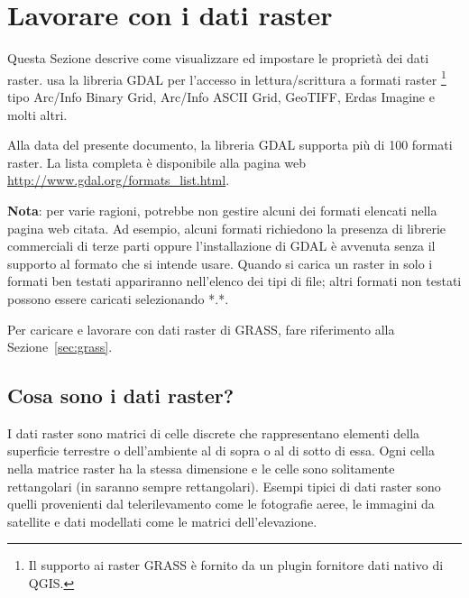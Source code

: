 
\chapter{Lavorare con i dati raster}\label{label_raster}


Questa Sezione descrive come visualizzare ed impostare le proprietà dei dati
raster. 
\qg usa la libreria GDAL per l'accesso in lettura/scrittura a formati raster
\footnote{Il supporto ai raster GRASS è fornito da un plugin fornitore dati nativo di QGIS.}
tipo Arc/Info Binary Grid,
Arc/Info ASCII Grid, GeoTIFF,
Erdas Imagine e molti altri. 

Alla data del presente documento, la libreria GDAL \cite{GDALweb} supporta più di 
100 formati raster. La lista completa è disponibile alla pagina web 
\url{http://www.gdal.org/formats_list.html}.

\textbf{Nota}: per varie ragioni, \qg potrebbe non gestire alcuni dei formati 
elencati nella pagina web citata. Ad esempio, alcuni formati richiedono la 
presenza di librerie commerciali di terze parti oppure l'installazione di 
GDAL è avvenuta senza il supporto al formato che si intende usare. Quando si 
carica un raster in \qg solo i formati ben testati appariranno nell'elenco 
dei tipi di file; altri formati non testati possono essere caricati 
selezionando *.*.

Per caricare e lavorare con dati raster di GRASS, fare riferimento alla Sezione~\ref{sec:grass}.

\section{Cosa sono i dati raster?}\label{label_whatsraster}

I dati raster sono matrici di celle discrete che rappresentano elementi della 
superficie terrestre o dell'ambiente al di sopra o al di sotto di essa. 
Ogni cella nella matrice raster ha la stessa dimensione e le celle sono 
solitamente rettangolari (in \qg saranno sempre rettangolari). Esempi
tipici di dati raster sono quelli provenienti dal telerilevamento come le
fotografie aeree, le immagini da satellite e dati modellati come le matrici dell'elevazione.

